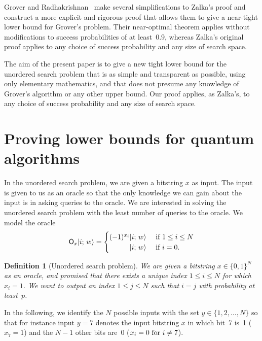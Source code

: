 \documentclass{article}
\newtheorem{definition}[theorem]{Definition}
\newcommand{\op}[1]{\mathsf{#1}}
\newcommand{\ket}[1]{\vert #1 \rangle}
\begin{document}
Grover and Radhakrishnan~\cite{GR} make several simplifications to
Zalka's proof and construct a more explicit and rigorous proof that
allows them to give a near-tight lower bound for Grover's problem.
Their near-optimal theorem applies without modifications to success
probabilities of at least~0.9, whereas Zalka's original proof applies
to any choice of success probability and any size of search space.

The aim of the present paper is to give a new tight lower bound for
the unordered search problem that is as simple and transparent as
possible, using only elementary mathematics, and that does not presume
any knowledge of Grover's algorithm or any other upper bound.  Our
proof applies, as Zalka's, to any choice of success probability and
any size of search space.


\section{Proving lower bounds for quantum algorithms}
\label{sec:general}
In the unordered search problem, we are given a bitstring $x$ as
input.  The input is given to us as an oracle so that the only
knowledge we can gain about the input is in asking queries to the
oracle.  We are interested in solving the unordered search problem
with the least number of queries to the oracle.  We model the oracle
\begin{equation*}
\op{O}_x \ket{i;\,w} = 
\begin{cases} (-1)^{x_i} \ket{i;\,w} & \textup{ if $1 \leq i \leq N$} \\
   \hphantom{(-1)^{x_i}} \ket{i;\,w} & \textup{ if $i = 0$.}
\end{cases}
\end{equation*}

\begin{definition}[Unordered search problem]
  We are given a bitstring $x \in \{0,1\}^N$ as an oracle, and
  promised that there exists a unique index $1 \leq i \leq N$ for
  which $x_i=1$.  We want to output an index $1 \leq j \leq N$ such
  that $i=j$ with probability at least~$p$.
\end{definition}

In the following, we identify the $N$ possible inputs with the set $y
\in \{1, 2, \ldots, N\}$ so that for instance input $y=7$ denotes the
input bitstring $x$ in which bit~7 is~1 ($x_7=1$) and the $N-1$ other
bits are~0 ($x_i = 0 \textnormal{ for $i \neq 7$}$).
\end{document}
